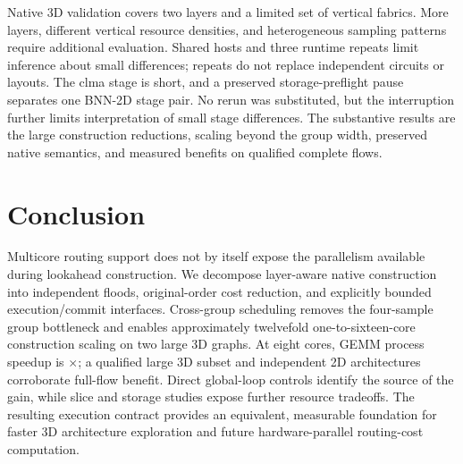 \documentclass[conference,10pt,letterpaper]{IEEEtran}
\newcommand{\speedup}{\ensuremath{\times}}
\begin{document}
Native 3D validation covers two layers and a limited set of vertical fabrics. More layers, different vertical resource densities, and heterogeneous sampling patterns require additional evaluation. Shared hosts and three runtime repeats limit inference about small differences; repeats do not replace independent circuits or layouts. The clma stage is short, and a preserved storage-preflight pause separates one BNN-2D stage pair. No rerun was substituted, but the interruption further limits interpretation of small stage differences. The substantive results are the large construction reductions, scaling beyond the group width, preserved native semantics, and measured benefits on qualified complete flows.

\section{Conclusion}
Multicore routing support does not by itself expose the parallelism available during lookahead construction. We decompose layer-aware native construction into independent floods, original-order cost reduction, and explicitly bounded execution/commit interfaces. Cross-group scheduling removes the four-sample group bottleneck and enables approximately twelvefold one-to-sixteen-core construction scaling on two large 3D graphs. At eight cores, GEMM process speedup is \PrimarySpeed\speedup; a qualified large 3D subset and independent 2D architectures corroborate full-flow benefit. Direct global-loop controls identify the source of the gain, while slice and storage studies expose further resource tradeoffs. The resulting execution contract provides an equivalent, measurable foundation for faster 3D architecture exploration and future hardware-parallel routing-cost computation.

\clearpage


\end{document}
